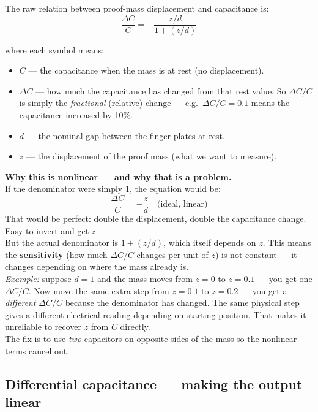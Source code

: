 \documentclass[12pt, a4paper]{article}
\begin{document}
The raw relation between proof-mass displacement and capacitance is:
\[
  \frac{\Delta C}{C} = -\frac{z/d}{1+(z/d)}
\]

where each symbol means:
\begin{itemize}[leftmargin=1.4em]
  \item $C$ --- the capacitance when the mass is at rest (no displacement).
  \item $\Delta C$ --- how much the capacitance has changed from that rest value.
        So $\Delta C / C$ is simply the \emph{fractional} (relative) change ---
        e.g.\ $\Delta C/C = 0.1$ means the capacitance increased by 10\%.
  \item $d$ --- the nominal gap between the finger plates at rest.
  \item $z$ --- the displacement of the proof mass (what we want to measure).
\end{itemize}

\begin{warnbox}
  \textbf{Why this is nonlinear --- and why that is a problem.}\\[4pt]
  If the denominator were simply 1, the equation would be:
  \[
    \frac{\Delta C}{C} = -\frac{z}{d} \quad \text{(ideal, linear)}
  \]
  That would be perfect: double the displacement, double the capacitance
  change. Easy to invert and get $z$.\\[4pt]
  But the actual denominator is $1 + (z/d)$, which itself depends on $z$.
  This means the \textbf{sensitivity} (how much $\Delta C/C$ changes per
  unit of $z$) is not constant --- it changes depending on where the mass
  already is.\\[4pt]
  \textit{Example:} suppose $d = 1$ and the mass moves from $z=0$ to
  $z=0.1$ --- you get one $\Delta C/C$.
  Now move the same extra step from $z=0.1$ to $z=0.2$ --- you get a
  \emph{different} $\Delta C/C$ because the denominator has changed.
  The same physical step gives a different electrical reading depending
  on starting position.
  That makes it unreliable to recover $z$ from $C$ directly.\\[4pt]
  The fix is to use \emph{two} capacitors on opposite sides of the mass
  so the nonlinear terms cancel out.
\end{warnbox}

\subsection*{Differential capacitance --- making the output linear}
\end{document}
